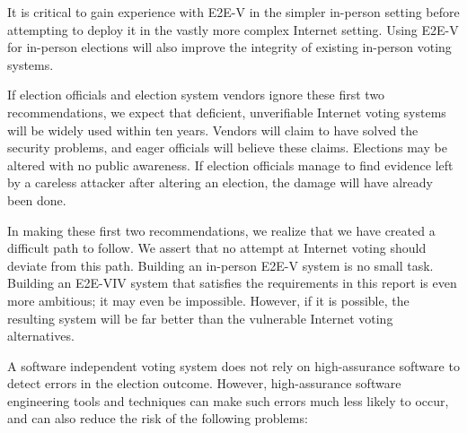 It is critical to gain experience with E2E-V in the simpler in-person
setting before attempting to deploy it in the vastly more complex
Internet setting. Using E2E-V for in-person elections will also
improve the integrity of existing in-person voting systems.
 
If election officials and election system vendors ignore these first
two recommendations, we expect that deficient, unverifiable Internet
voting systems will be widely used within ten years.  Vendors will
claim to have solved the security problems, and eager officials will
believe these claims.  Elections may be altered with no public
awareness.  If election officials manage to find evidence left by a
careless attacker after altering an election, the damage will have
already been done.
 
In making these first two recommendations, we realize that we have
created a difficult path to follow. We assert that no attempt at
Internet voting should deviate from this path.  Building an in-person
E2E-V system is no small task. Building an E2E-VIV system that
satisfies the requirements in this report is even more ambitious; it
may even be impossible. However, if it is possible, the resulting
system will be far better than the vulnerable Internet voting
alternatives.


A software independent voting system does not rely on high-assurance
software to detect errors in the election outcome. However,
high-assurance software engineering tools and techniques can make such
errors much less likely to occur, and can also reduce the risk of the
following problems:

